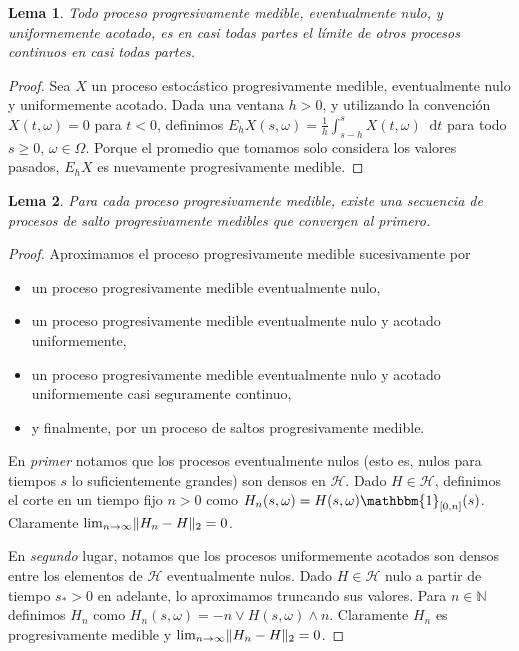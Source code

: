 \documentclass{report}
\newcommand{\characteristic}{\mathbbm{1}}
\newcommand{\dd}{\mathop{}\!\mathrm{d}}
\newcommand{\naturalNumbers}{\mathbb{N}}
\DeclarePairedDelimiter{\norm}{\|}{\|}
\theoremstyle{plain}
\newtheorem{lemma}{Lema}
\theoremstyle{remark}
\theoremstyle{definition}
\begin{document}
\begin{lemma}
  Todo proceso progresivamente medible, eventualmente nulo, y uniformemente acotado, es en casi todas partes el límite de otros procesos continuos en casi todas partes. 
\end{lemma}
\begin{proof}
  Sea \(X\) un proceso estocástico progresivamente medible, eventualmente nulo y uniformemente acotado.
  Dada una ventana \(h > 0\), y utilizando la convención \(X(t, \omega) = 0\) para \(t < 0\), definimos \(E_h X (s, \omega) = \frac{1}{h} \int_{s - h}^{s} X(t, \omega) \dd t\) para todo \(s \geq 0\), \(\omega \in \Omega\).
  Porque el promedio que tomamos solo considera los valores pasados, \(E_h X\) es nuevamente progresivamente medible.
  
\end{proof}

\begin{lemma}
  Para cada proceso progresivamente medible, existe una secuencia de procesos de salto progresivamente medibles que convergen al primero.
\end{lemma}
\begin{proof}
  Aproximamos el proceso progresivamente medible sucesivamente por
  \begin{itemize}
    \item un proceso progresivamente medible eventualmente nulo,
    \item un proceso progresivamente medible eventualmente nulo y acotado uniformemente,
    \item  un proceso progresivamente medible eventualmente nulo y acotado uniformemente casi seguramente continuo,
    \item y finalmente, por un proceso de saltos progresivamente medible.
  \end{itemize}
  
  En \emph{primer} notamos que los procesos eventualmente nulos (esto es, nulos para tiempos \(s\) lo suficientemente grandes) son densos en \(\mathcal{H}\).
  Dado \(H \in \mathcal{H}\), definimos el corte en un tiempo fijo \(n > 0\) como \(H_n(s, \omega) = H(s, \omega) \characteristic_{[0, n]}(s)\).
  Claramente \(\lim_{n \rightarrow \infty} \norm{H_n - H}_2 = 0\).

  En \emph{segundo} lugar, notamos que los procesos uniformemente acotados son densos entre los elementos de \(\mathcal{H}\) eventualmente nulos.
  Dado \(H \in \mathcal{H}\) nulo a partir de tiempo \(s_* > 0\) en adelante, lo aproximamos truncando sus valores.
  Para \(n \in \naturalNumbers\) definimos \(H_n\) como \(H_n(s, \omega) = -n \vee H(s, \omega) \wedge n\).
  Claramente \(H_n\) es progresivamente medible y \(\lim_{n \rightarrow \infty} \norm{H_n - H}_2 = 0\).
\end{proof}
\end{document}
